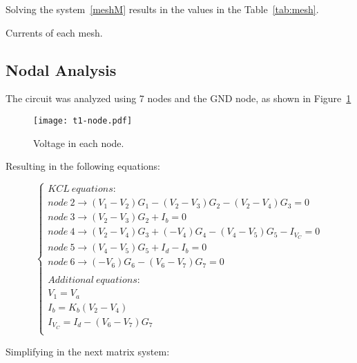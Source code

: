 Solving the system~\ref{meshM} results in the values in the Table~\ref{tab:mesh}.

\begin{table}[ht!]
  \centering
  
  \caption{Currents of each mesh.}
  \label{tab:mesh}
\end{table}
\FloatBarrier






\subsection{Nodal Analysis}
The circuit was analyzed using 7 nodes and the GND node, as shown in Figure~\ref{fig:node}

\begin{figure}[ht!]
  \centering
  \texttt{[image: t1-node.pdf]}
  \caption{Voltage in each node.}
  \label{fig:node}
\end{figure}

Resulting in the following equations:

\begin{equation}\label{nodeEq}
  \begin{cases}
    KCL\ equations:\\
    node\ 2\to (V_1-V_2)G_1 - (V_2-V_3)G_2 - (V_2-V_4)G_3 = 0\\
    node\ 3\to (V_2-V_3)G_2 + I_b = 0\\
    node\ 4\to (V_2-V_4)G_3 + (-V_4)G_4 - (V_4-V_5)G_5 - I_{V_C} = 0\\
    node\ 5\to (V_4-V_5)G_5 + I_d - I_b = 0\\
    node\ 6\to (-V_6)G_6 - (V_6-V_7)G_7 = 0\\
    \\
    Additional\ equations:\\
    V_1 = V_a\\
    I_b = K_b(V_2-V_4)\\
    I_{V_C} = I_d - (V_6-V_7)G_7\\
  \end{cases}
\end{equation}

Simplifying in the next matrix system:

